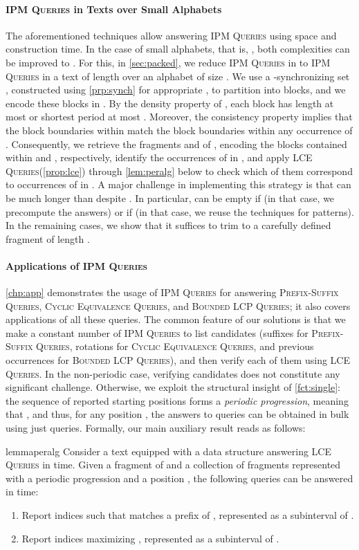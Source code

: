\documentclass[a4paper]{article}
\theoremstyle{definition}
\theoremstyle{remark}
\newcommand{\IPM}{\textsc{IPM Queries}\xspace}
\newcommand{\BQ}{\textsc{Prefix-Suffix Queries}\xspace}
\newcommand{\FC}{\textsc{Cyclic Equivalence Queries}\xspace}
\newcommand{\BLCP}{\textsc{Bounded LCP Queries}\xspace}
\newcommand{\LCEQ}{\textsc{LCE Queries}\xspace}
\begin{document}
\paragraph{\IPM in Texts over Small Alphabets}
The aforementioned techniques allow answering \IPM using  space and  construction time.
In the case of small alphabets, that is, , both complexities can be improved to .
For this, in \cref{sec:packed}, we reduce \IPM in  to \IPM in a text  of length 
over an alphabet of size . 
We use a -synchronizing set , constructed using \cref{prp:synch} for appropriate ,
to partition  into blocks, and we encode these blocks in .
By the density property of , each block has length at most  or shortest period at most .
Moreover, the consistency property implies that the block boundaries within  match the block boundaries within any occurrence of .
Consequently, we retrieve the fragments  and  of , encoding the blocks contained within  and , respectively,
identify the occurrences of  in , and apply \LCEQ (\cref{prop:lce}) through \cref{lem:peralg} below to check which of them correspond to occurrences of  in .
A major challenge in implementing this strategy is that  can be much longer than  despite .
In particular,  can be empty if  (in that case, we precompute the answers) or if  (in that case, we reuse the techniques for  patterns). In the remaining cases, we show that it suffices to trim  to a carefully defined fragment of length .

\paragraph{Applications of \IPM}
\cref{chp:app} demonstrates the usage of \IPM for answering \BQ, \FC, and \BLCP; it also covers applications of all these queries.
The common feature of our solutions is that we make a constant number of \IPM to list candidates (suffixes for \BQ, rotations for \FC, and previous occurrences for \BLCP), and then verify each of them using \LCEQ.
In the non-periodic case, verifying  candidates does not constitute any significant challenge. 
Otherwise, we exploit the structural insight of \cref{fct:single}: the sequence 
of reported starting positions forms a \emph{periodic progression}, meaning that ,
and thus, for any position , the answers to queries  can be obtained in bulk using just   queries. 
Formally, our main auxiliary result reads as follows:

\begin{restatable}{lemma}{peralg}\label{lem:peralg}
  Consider a text  equipped with a data structure answering \LCEQ in  time.
  Given a fragment  of  and a collection of fragments  represented with a periodic progression  and a position ,
  the following queries can be answered in  time:
  \begin{enumerate}[label=(\alph*)]
    \item\label{it:perpref} Report indices  such that  matches a prefix of , represented as a subinterval of .
     \item\label{it:permax} Report indices  maximizing , represented as a subinterval of .
  \end{enumerate}
\end{restatable}
\end{document}
